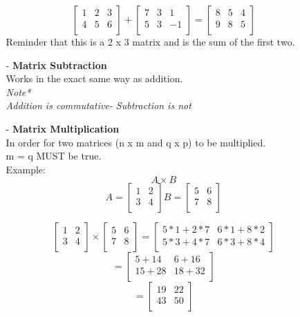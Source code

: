 \documentclass[12pt]{article}
\begin{document}
\begin{flushleft}
\begin{itemize}
\begin{flushleft}
\begin{itemize}
		$$\begin{bmatrix}
			1 & 2  & 3 \\
			4 & 5 & 6 \\
		\end{bmatrix}
	+  \begin{bmatrix}
		7 & 3  & 1 \\
		5 & 3 & -1\\
	\end{bmatrix}
= \begin{bmatrix}
	8 & 5  & 4 \\
	9 & 8 & 5 \\
\end{bmatrix} $$
Reminder that this is a 2 x 3 matrix and is the sum of the first two.\\
\item[-] \textbf{Matrix Subtraction} \\ Works in the exact same way as addition. \\

\textit{Note* \\Addition is commutative- Subtraction is not}\\

\item[-] \textbf{Matrix Multiplication}\\
In order for two matrices (n x m and q x p) to be multiplied. \\
m = q MUST be true. \\
Example:
$$ A \times B$$
$$ A = \begin{bmatrix}
	1 & 2 \\ 3 & 4 \\
\end{bmatrix} B = \begin{bmatrix}
5 & 6 \\ 7 & 8 \\
\end{bmatrix} $$


$$  \begin{bmatrix}1 & 2 \\ 3 & 4 \\ \end{bmatrix} 
\times  
\begin{bmatrix} 5 & 6 \\ 7 & 8 \\ \end{bmatrix} 
= \begin{bmatrix}
	5 * 1 + 2 * 7  & 6 * 1 + 8 * 2 \\
	5 * 3 + 4 * 7 & 6 * 3 + 8 * 4 \\
\end{bmatrix}$$
$$ = \begin{bmatrix}
	5 + 14 & 6 + 16 \\
	15 + 28 & 18 + 32 \\
\end{bmatrix}$$
$$ = \begin{bmatrix}
	19 & 22 \\
	43 & 50 \\
\end{bmatrix} $$



\end{itemize}
\end{flushleft}
\end{itemize}
\end{flushleft}
\end{document}
